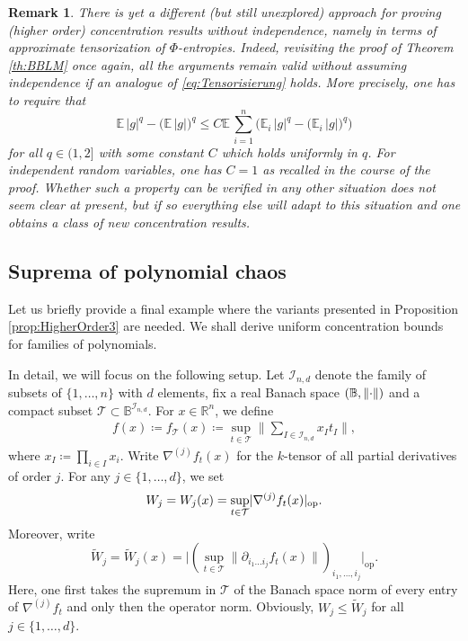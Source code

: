 \documentclass[a4paper,12pt]{amsart}
\numberwithin{equation}{section}
\newtheorem{bemerkung}[satz]{Remark}
\theoremstyle{remark}
\DeclarePairedDelimiter	{\abs}		{\lvert}	{\rvert}
\DeclarePairedDelimiter	{\norm}		{\lVert}	{\rVert}
\def\R{{\mathbb R}}
\begin{document}
\begin{bemerkung}
	There is yet a different (but still unexplored) approach for proving (higher order) concentration results without independence, namely in terms of approximate tensorization of $\Phi$-entropies. Indeed, revisiting the proof of Theorem \ref{th:BBLM} once again, all the arguments remain valid without assuming independence if an analogue of \eqref{eq:Tensorisierung} holds. More precisely, one has to require that
	\[
	\mathbb{E}\, |g|^q - \big(\mathbb{E}\, |g|\big)^q \le C
	\mathbb{E}\, \sum_{i=1}^{n} \Big(\mathbb{E}_i\, |g|^q - 
	\big(\mathbb{E}_i\, |g|\big)^q\Big)
	\]
	for all $q \in (1,2]$ with some constant $C$ which holds uniformly in $q$. For independent random variables, one has $C=1$ as recalled in the course of the proof. Whether such a property can be verified in any other situation does not seem clear at present, but if so everything else will adapt to this situation and one obtains a class of new concentration results.
\end{bemerkung}

\subsection{Suprema of polynomial chaos}\label{sec:PolCh}

Let us briefly provide a final example where the variants presented in Proposition \ref{prop:HigherOrder3} are needed. We shall derive uniform concentration bounds for families of polynomials.

In detail, we will focus on the following setup. Let $\mathcal{I}_{n,d}$ denote the family of subsets of $\{1, \ldots, n\}$ with $d$ elements, fix a real Banach space $(\mathbb{B}, \norm{\cdot})$ and a compact subset $\mathcal{T} \subset \mathbb{B}^{\mathcal{I}_{n,d}}$. For $x \in \R^n$, we define
\begin{align}		\label{eqn:fTauNew}
	f(x) \coloneqq f_{\mathcal{T}}(x) \coloneqq \sup_{t \in \mathcal{T}}  \Big \lVert \sum_{I \in \mathcal{I}_{n,d}} x_I t_I \Big\rVert,
\end{align} 
where $x_I \coloneqq \prod_{i \in I} x_i$. Write $\nabla^{(j)} f_t(x)$ for the $k$-tensor of all partial derivatives of order $j$. For any $j \in \{1, \ldots, d\}$, we set
\[
W_j = W_j(x) = \sup_{t \in \mathcal{T}} \abs{\nabla^{(j)} f_t(x)}_{\mathrm{op}}.
\]
Moreover, write
\[
\tilde{W}_j = \tilde{W}_j(x) = \lvert (\sup_{t \in \mathcal{T}} \lVert \partial_{i_1 \ldots i_j} f_t(x) \rVert)_{i_1, \ldots, i_j} \rvert_\mathrm{op}.
\]
Here, one first takes the supremum in $\mathcal{T}$ of the Banach space norm of every entry of $\nabla^{(j)} f_t$ and only then the operator norm. Obviously, $W_j \le \tilde{W}_j$ for all $j \in \{1, \ldots, d\}$.
\end{document}
